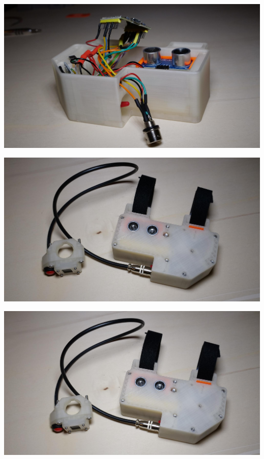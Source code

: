 \documentclass[
]{article}
\begin{document}
{\includegraphics{images/image7.jpg}}

{\includegraphics{images/image13.jpg}}

{\includegraphics{images/image10.jpg}}
\end{document}
